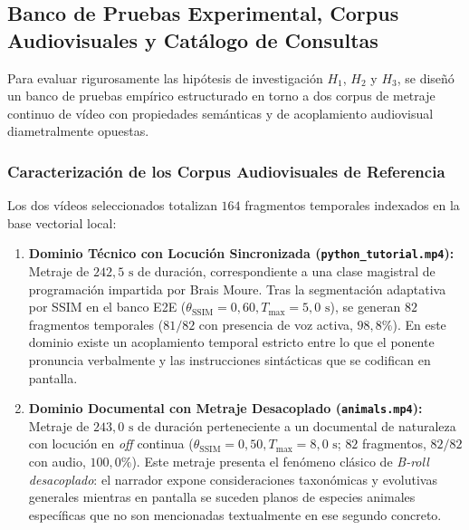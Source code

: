 \subsection{Banco de Pruebas Experimental, Corpus Audiovisuales y Catálogo de Consultas}
\label{subsec:banco_pruebas_corpus}

Para evaluar rigurosamente las hipótesis de investigación $H_1$, $H_2$ y $H_3$, se diseñó un banco de pruebas empírico estructurado en torno a dos corpus de metraje continuo de vídeo con propiedades semánticas y de acoplamiento audiovisual diametralmente opuestas.

\subsubsection{Caracterización de los Corpus Audiovisuales de Referencia}
Los dos vídeos seleccionados totalizan $164$ fragmentos temporales indexados en la base vectorial local:
\begin{enumerate}
    \item \textbf{Dominio Técnico con Locución Sincronizada (\texttt{python\_tutorial.mp4}):} Metraje de $242,5\text{ s}$ de duración, correspondiente a una clase magistral de programación impartida por Brais Moure. Tras la segmentación adaptativa por SSIM en el banco E2E ($\theta_{\text{SSIM}} = 0,60, T_{\max} = 5,0\text{ s}$), se generan $82$ fragmentos temporales ($81/82$ con presencia de voz activa, $98,8\%$). En este dominio existe un acoplamiento temporal estricto entre lo que el ponente pronuncia verbalmente y las instrucciones sintácticas que se codifican en pantalla.
    \item \textbf{Dominio Documental con Metraje Desacoplado (\texttt{animals.mp4}):} Metraje de $243,0\text{ s}$ de duración perteneciente a un documental de naturaleza con locución en \textit{off} continua ($\theta_{\text{SSIM}} = 0,50, T_{\max} = 8,0\text{ s}$; $82$ fragmentos, $82/82$ con audio, $100,0\%$). Este metraje presenta el fenómeno clásico de \textit{B-roll desacoplado}: el narrador expone consideraciones taxonómicas y evolutivas generales mientras en pantalla se suceden planos de especies animales específicas que no son mencionadas textualmente en ese segundo concreto.
\end{enumerate}

